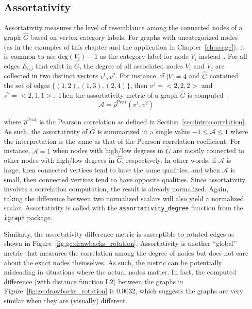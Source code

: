 \subsection{Assortativity}

Assortativity measures the level of resemblance among the connected nodes of a 
graph $\hat{G}$ based on vertex category labels. For graphs with uncategorized 
nodes (as in the examples of this chapter and the 
application in Chapter~\ref{ch:usage}), it is common to use $\text{deg}(V_i)-1$
as the category label for node $V_i$ instead~\cite{igraph}. 
For all edges $E_{i,j}$ that 
exist in $\hat{G}$, the degree of all associated nodes $V_i$ and $V_j$ are 
collected in two distinct vectors $v^1, v^2$. For instance, if $|V| = 4$ and 
$\hat{G}$ contained the set of edges $\{(1,2), (1,3), (2,4)\}$, then $v^1 = 
<2,2,2>$ and $v^2 = <2,1,1>$. Then the assortativity metric of a graph 
$\hat{G}$ is computed~\cite{newman2002}:
$$\mathcal{A} = \hat{\rho}^\text{Pear}(v^1,v^2)$$

\noindent where $\hat{\rho}^\text{Pear}$ is the Pearson 
correlation as defined in Section~\ref{sec:intro:correlation}. As such, 
the assortativity of $\hat{G}$ is summarized in a single value 
$-1 \leq \mathcal{A} \leq 1$ where the interpretation is the same as that of 
the Pearson correlation coefficient. For instance, $\mathcal{A}=1$ when nodes 
with high/low degrees in $\hat{G}$ are mostly connected to other nodes with 
high/low degrees in $\hat{G}$, respectively. In other words, if 
$\mathcal{A}$ is large, then connected vertices tend to have the same 
qualities, and when $\mathcal{A}$ is small, then connected vertices tend to 
have opposite qualities. Since assortativity involves a correlation 
computation, the result is already normalized. Again, taking the difference 
between two normalized scalars will also yield a normalized scalar.
Assortativity is called with the \texttt{assortativity\_degree} function from 
the \texttt{igraph} package.

Similarly, the assortativity difference metric is susceptible to rotated edges 
as shown in Figure~\ref{fig:gc:drawbacks_rotation}. Assortativity is another 
``global'' metric that measures the correlation among the degree of nodes but 
does not care about the exact nodes themselves. As such, the metric can be 
potentially misleading in situations where the actual nodes matter. In fact, 
the computed difference (with distance function L2) between the graphs in 
Figure~\ref{fig:gc:drawbacks_rotation} is 0.0032, which suggests the graphs are 
very similar when they are (visually) different.







